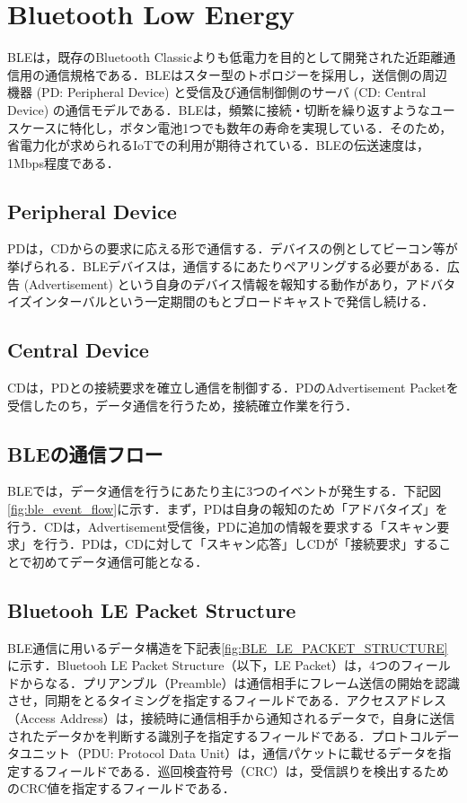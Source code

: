 \section{Bluetooth Low Energy}
BLEは，既存のBluetooth Classicよりも低電力を目的として開発された近距離通信用の通信規格である．BLEはスター型のトポロジーを採用し，送信側の周辺機器 (PD: Peripheral Device) と受信及び通信制御側のサーバ (CD: Central Device) の通信モデルである．BLEは，頻繁に接続・切断を繰り返すようなユースケースに特化し，ボタン電池1つでも数年の寿命を実現している．そのため，省電力化が求められるIoTでの利用が期待されている．BLEの伝送速度は，1Mbps程度である．

\subsection{Peripheral Device}
PDは，CDからの要求に応える形で通信する．デバイスの例としてビーコン等が挙げられる．BLEデバイスは，通信するにあたりペアリングする必要がある．広告 (Advertisement) という自身のデバイス情報を報知する動作があり，アドバタイズインターバルという一定期間のもとブロードキャストで発信し続ける．

\subsection{Central Device}
CDは，PDとの接続要求を確立し通信を制御する．PDのAdvertisement Packetを受信したのち，データ通信を行うため，接続確立作業を行う．

\subsection{BLEの通信フロー}
BLEでは，データ通信を行うにあたり主に3つのイベントが発生する．下記図\ref{fig:ble_event_flow}に示す．まず，PDは自身の報知のため「アドバタイズ」を行う．CDは，Advertisement受信後，PDに追加の情報を要求する「スキャン要求」を行う．PDは，CDに対して「スキャン応答」しCDが「接続要求」することで初めてデータ通信可能となる．

\subsection{Bluetooh LE Packet Structure}
BLE通信に用いるデータ構造を下記表\ref{fig:BLE_LE_PACKET_STRUCTURE}に示す．Bluetooh LE Packet Structure（以下，LE Packet）は，4つのフィールドからなる．プリアンブル（Preamble）は通信相手にフレーム送信の開始を認識させ，同期をとるタイミングを指定するフィールドである．アクセスアドレス（Access Address）は，接続時に通信相手から通知されるデータで，自身に送信されたデータかを判断する識別子を指定するフィールドである．プロトコルデータユニット（PDU: Protocol Data Unit）は，通信パケットに載せるデータを指定するフィールドである．巡回検査符号（CRC）は，受信誤りを検出するためのCRC値を指定するフィールドである．

